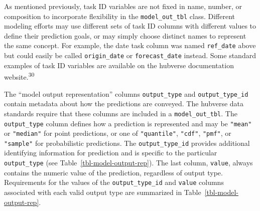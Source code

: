 \documentclass[
]{article}
\begin{document}
As mentioned previously, task ID variables are not fixed in name,
number, or composition to incorporate flexibility in the
\texttt{model\_out\_tbl} class. Different modeling efforts may use
different sets of task ID columns with different values to define their
prediction goals, or may simply choose distinct names to represent the
same concept. For example, the date task column was named
\texttt{ref\_date} above but could easily be called
\texttt{origin\_date} or \texttt{forecast\_date} instead. Some standard
examples of task ID variables are available on the hubverse
documentation website.\textsuperscript{30}

The ``model output representation'' columns \texttt{output\_type} and
\texttt{output\_type\_id} contain metadata about how the predictions are
conveyed. The hubverse data standards require that these columns are
included in a \texttt{model\_out\_tbl}. The \texttt{output\_type} column
defines how a prediction is represented and may be \texttt{"mean"} or
\texttt{"median"} for point predictions, or one of \texttt{"quantile"},
\texttt{"cdf"}, \texttt{"pmf"}, or \texttt{"sample"} for probabilistic
predictions. The \texttt{output\_type\_id} provides additional
identifying information for prediction and is specific to the particular
\texttt{output\_type} (see Table~\ref{tbl-model-output-rep}). The last
column, \texttt{value}, always contains the numeric value of the
prediction, regardless of output type. Requirements for the values of
the \texttt{output\_type\_id} and \texttt{value} columns associated with
each valid output type are summarized in
Table~\ref{tbl-model-output-rep}.
\end{document}
